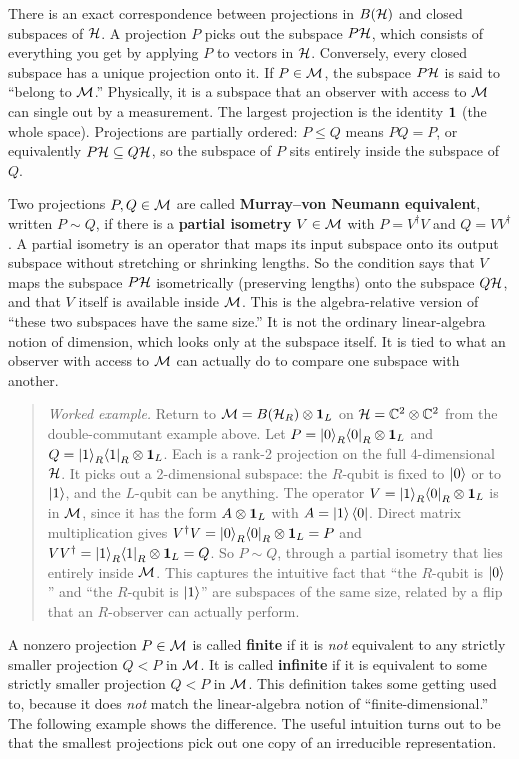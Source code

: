 There is an exact correspondence between projections in $B(\mathcal{H})$ and closed subspaces of $\mathcal{H}$. A projection
$P$ picks out the subspace $P\mathcal{H}$, which consists of everything you get by applying $P$ to vectors in $\mathcal{H}$.
Conversely, every closed subspace has a unique projection onto it. If $P\in\mathcal{M}$, the subspace $P\mathcal{H}$ is said to
``belong to $\mathcal{M}$.'' Physically, it is a subspace that an observer with access to $\mathcal{M}$ can single out by a
measurement. The largest projection is the identity $\mathbf{1}$ (the whole space). Projections are partially
ordered: $P\le Q$ means $PQ=P$, or equivalently $P\mathcal{H}\subseteq Q\mathcal{H}$, so the subspace of $P$ sits entirely
inside the subspace of $Q$.

Two projections $P,Q\in\mathcal{M}$ are called \textbf{Murray--von Neumann equivalent}, written $P\sim Q$, if there is
a \textbf{partial isometry} $V\in\mathcal{M}$ with $P=V^\dagger V$ and $Q=VV^\dagger$. A partial isometry is an operator
that maps its input subspace onto its output subspace without stretching or shrinking lengths. So the
condition says that $V$ maps the subspace $P\mathcal{H}$ isometrically (preserving lengths) onto the subspace
$Q\mathcal{H}$, and that $V$ itself is available inside $\mathcal{M}$. This is the algebra-relative version of ``these two
subspaces have the same size.'' It is not the ordinary linear-algebra notion of dimension, which looks only
at the subspace itself. It is tied to what an observer with access to $\mathcal{M}$ can actually do to compare one
subspace with another.

\begin{quote}
\textit{Worked example.} Return to $\mathcal{M}=B(\mathcal{H}_R)\otimes\mathbf{1}_L$ on $\mathcal{H}=\mathbb C^2\otimes\mathbb C^2$ from the
double-commutant example above. Let $P=\ket0_R\!\bra0_R\otimes\mathbf{1}_L$ and $Q=\ket1_R\!\bra1_R\otimes\mathbf{1}_L$.
Each is a rank-2 projection on the full 4-dimensional $\mathcal{H}$. It picks out a 2-dimensional subspace: the
$R$-qubit is fixed to $\ket0$ or to $\ket1$, and the $L$-qubit can be anything. The operator
$V=\ket1_R\!\bra0_R\otimes\mathbf{1}_L$ is in $\mathcal{M}$, since it has the form $A\otimes\mathbf{1}_L$ with $A=\ket1\bra0$.
Direct matrix multiplication gives $V^\dagger V=\ket0_R\!\bra0_R\otimes\mathbf{1}_L=P$ and
$VV^\dagger=\ket1_R\!\bra1_R\otimes\mathbf{1}_L=Q$. So $P\sim Q$, through a partial isometry that lies entirely
inside $\mathcal{M}$. This captures the intuitive fact that ``the $R$-qubit is $\ket0$'' and ``the $R$-qubit is
$\ket1$'' are subspaces of the same size, related by a flip that an $R$-observer can actually perform.
\end{quote}

A nonzero projection $P\in\mathcal{M}$ is called \textbf{finite} if it is \emph{not} equivalent to any strictly smaller
projection $Q<P$ in $\mathcal{M}$. It is called \textbf{infinite} if it is equivalent to some strictly smaller
projection $Q<P$ in $\mathcal{M}$. This definition takes some getting used to, because it does \emph{not} match the
linear-algebra notion of ``finite-dimensional.'' The following example shows the difference. The useful
intuition turns out to be that the smallest projections pick out one copy of an irreducible representation.

